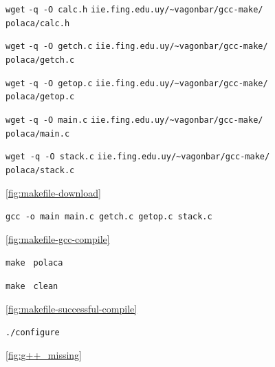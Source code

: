 \documentclass[11pt]{article}
\newcommand{\codetext}[2]{\large\texttt{\textcolor{#1}{#2}}}
\newcommand{\imagecaption}[1]{\vspace{-7pt}\caption*{\char91\ref{fig:#1}\char93}}
\begin{document}
		\begin{figure}[H]
			\centering
			\begin{code-box}
				\codetext{light-blue}{wget} \codetext{orange-desert-vim}{-q -O calc.h} \codetext{light-red}{iie.fing.edu.uy/\textasciitilde{}vagonbar/gcc-make/ polaca/calc.h}
				
				\codetext{light-blue}{wget} \codetext{orange-desert-vim}{-q -O getch.c} \codetext{light-red}{iie.fing.edu.uy/\textasciitilde{}vagonbar/gcc-make/ polaca/getch.c}
				
			  	\codetext{light-blue}{wget} \codetext{orange-desert-vim}{-q -O getop.c} \codetext{light-red}{iie.fing.edu.uy/\textasciitilde{}vagonbar/gcc-make/ polaca/getop.c}
				
				\codetext{light-blue}{wget} \codetext{orange-desert-vim}{-q -O  main.c} \codetext{light-red}{iie.fing.edu.uy/\textasciitilde{}vagonbar/gcc-make/ polaca/main.c}
				
				\codetext{light-blue}{wget }\codetext{orange-desert-vim}{-q -O stack.c} \codetext{light-red}{iie.fing.edu.uy/\textasciitilde{}vagonbar/gcc-make/ polaca/stack.c}
			
			\end{code-box}
			\imagecaption{makefile-download}
		\end{figure}
		
		\begin{figure}[H]
			\centering
			\begin{code-box}
				\codetext{light-blue}{gcc }\codetext{orange-desert-vim}{-o main }\codetext{light-red}{main.c getch.c getop.c stack.c}
			\end{code-box}
			\imagecaption{makefile-gcc-compile}
		\end{figure}
		
		\begin{figure}[H]
			\centering
			\begin{code-box}
				\codetext{light-blue}{make } \codetext{light-red}{polaca}
                
                		\codetext{light-blue}{make } \codetext{light-red}{clean}

			\end{code-box}
			\imagecaption{makefile-successful-compile}
		\end{figure}
		
		\begin{figure}[H]
			\centering
			\begin{code-box}
				\codetext{light-blue}{./configure}

			\end{code-box}
			\imagecaption{g++_missing}
		\end{figure}
		
\end{document}
